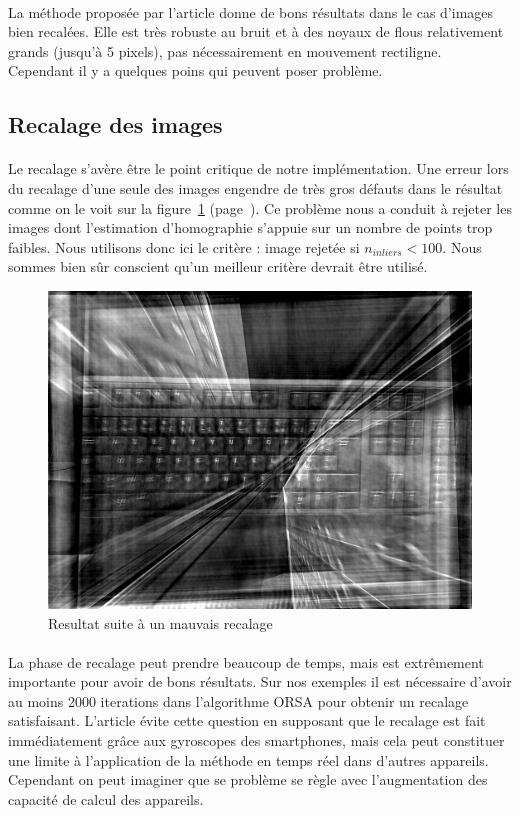 \documentclass[a4paper,10pt]{report}
\begin{document}
\paragraph{}
La méthode proposée par l'article donne de bons résultats dans le cas d'images bien recalées. Elle est très 
robuste au bruit et à des noyaux de flous relativement grands (jusqu'à 5 pixels), pas nécessairement en
mouvement rectiligne. Cependant il y a quelques poins qui peuvent poser problème.

\subsection{Recalage des images}

\paragraph{}
Le recalage s'avère être le point critique de notre implémentation. 
Une erreur lors du recalage d'une seule des images 
engendre de très gros défauts dans le résultat comme on le voit sur la 
figure~\ref{fig:mauvaisrecalage} (page~\pageref{fig:mauvaisrecalage}).
Ce problème nous a conduit à rejeter les images dont l'estimation d'homographie
s'appuie sur un nombre de points trop faibles. Nous utilisons donc ici le critère : 
image rejetée si \(n_{inliers} < 100\). 
Nous sommes bien sûr conscient qu'un meilleur critère devrait être utilisé. 

\begin{figure}[h]
\centering
\includegraphics[width=0.5\linewidth]{ressource/keyboardresultat.jpg} 
\caption{Resultat suite à un mauvais recalage}
\label{fig:mauvaisrecalage}
\end{figure}

\paragraph{}
La phase de recalage peut prendre beaucoup de temps, mais est extrêmement importante pour avoir de bons résultats.
Sur nos exemples il est nécessaire d'avoir au moins 2000 iterations dans l'algorithme ORSA pour obtenir un 
recalage satisfaisant. 
L'article évite cette question en supposant que le recalage est fait immédiatement grâce aux gyroscopes
des smartphones, mais cela peut constituer une limite à l'application de la méthode en temps réel dans 
d'autres appareils. Cependant on peut imaginer que se problème se règle avec l'augmentation des capacité de calcul 
des appareils.
\end{document}
